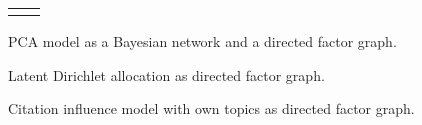 \documentclass[a4paper]{article}
\begin{document}
\begin{figure}[ht]
  \begin{center}
    \begin{tabular}{cc}
       &
      
    \end{tabular}
  \end{center}
  \caption{PCA model as a Bayesian network and a directed factor
    graph.}
\end{figure}

\begin{figure}[ht]
  \begin{center}
    
  \end{center}
  \caption{Latent Dirichlet allocation as directed factor graph.}
\end{figure}

\begin{figure}[ht]
  \begin{center}
    
  \end{center}
  \caption{Citation influence model with own topics as directed factor
    graph.}
\end{figure}
\end{document}
